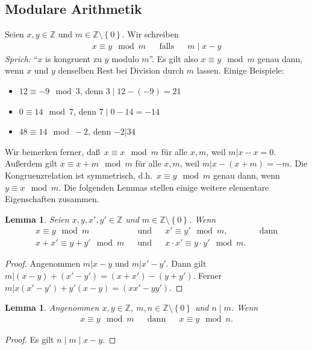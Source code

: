 \documentclass[10pt,reqno]{amsart}
\numberwithin{equation}{section}
\newcommand\ue{\"u}
\newcommand\ZZ{\mathbb Z}
\newtheorem{lemma}[definition]{Lemma}
\newcommand\cbc[1]{\left\{{#1}\right\}}
\begin{document}
\subsection{Modulare Arithmetik}\label{sec_mod}

Seien $x,y\in\ZZ$ und $m\in\ZZ\setminus\cbc 0$.
Wir schreiben
\begin{align*}
	x\equiv y\mod m&&\mbox{falls}&&m\mid x-y
\end{align*}
\emph{Sprich:} ``$x$ is kongruent zu $y$ modulo $m$''.
Es gilt also $x\equiv y\mod m$ genau dann, wenn $x$ und $y$ denselben Rest bei Division durch $m$ lassen.
Einige Beispiele:
\begin{itemize}
	\item $12\equiv -9\mod 3$, denn $3\mid 12-(-9)=21$
	\item $0\equiv 14\mod 7$, denn $7\mid 0-14=-14$
	\item $48\equiv 14\mod -2$, denn $-2|34$
\end{itemize}

Wir bemerken ferner, da\ss\ $x\equiv x\mod m$ f\ue r alle $x,m$, weil $m|x-x=0$.
Au\ss erdem gilt $x\equiv x+m\mod m$ f\ue r alle $x,m$, weil $m|x-(x+m)=-m$.
Die Kongruenzrelation ist symmetrisch, d.h.\ $x\equiv y\mod m$ genau dann, wenn $y\equiv x\mod m$.
Die folgenden Lemmas stellen einige weitere elementare Eigenschaften zusammen.

\begin{lemma}\label{lem_cong}
	Seien $x,y,x',y'\in\ZZ$ und $m\in\ZZ\setminus\cbc 0$.
	Wenn
	\begin{align*}
		x\equiv y\mod m&&\mbox{und}&&x'\equiv y'\mod m,&&\mbox{dann}\\
		x+x'\equiv y+y'\mod m&&\mbox{und}&&x\cdot x'\equiv y\cdot y'\mod m.
	\end{align*}
\end{lemma}
\begin{proof}
	Angenommen $m|x-y$ und $m|x'-y'$.
	Dann gilt $m|(x-y)+(x'-y')=(x+x')-(y+y')$.
	Ferner $m|x(x'-y')+y'(x-y)=(xx'-yy')$.
\end{proof}

\begin{lemma}\label{lem_mod}
	Angenommen $x,y\in\ZZ$, $m,n\in\ZZ\setminus\cbc 0$ und $n\mid m$.	
	Wenn
	\begin{align*}
		x\equiv y\mod m&&\mbox{dann}&&x\equiv y\mod n.
	\end{align*}
\end{lemma}
\begin{proof}
	Es gilt	$n\mid m\mid x-y.$
\end{proof}
\end{document}

